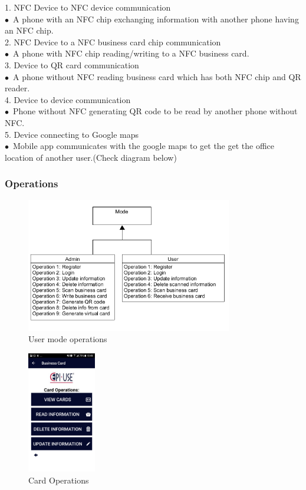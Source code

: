 \documentclass[english]{article}
\begin{document}
				1.	NFC Device to NFC device communication\\
$\bullet$\ A phone with an NFC chip exchanging information with another phone having an NFC chip.\\
2.	NFC Device to a NFC business card chip communication\\
$\bullet$\ A phone with NFC chip reading/writing to a NFC business card.\\
3.	Device to QR card communication\\
$\bullet$\ A phone without NFC reading business card which has both NFC chip and QR reader.\\
4.	Device to device communication\\
$\bullet$\ Phone without NFC generating QR code to be read by another phone without NFC.\\
5.	Device connecting to Google maps\\
$\bullet$\ Mobile app communicates with the google maps to get the get the office location of another user.(Check diagram below)


			
				
						\subsubsection{Operations}


\begin{figure}[ht!]
\centering
\includegraphics[width=90mm]{operation2.png}
\caption{User mode operations }
\end{figure}				



\begin{figure}[ht!]
\centering
\includegraphics[width=30mm]{operations.png}
\caption{Card Operations }
\end{figure}
\end{document}
